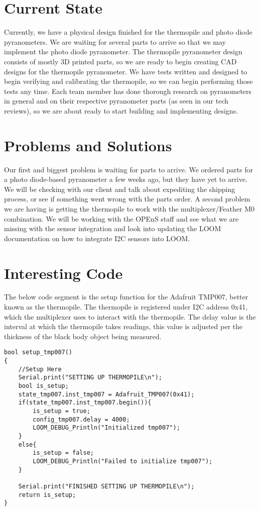 \documentclass[10pt,draftclsnofoot,onecolumn,letterpaper]{article}
\begin{document}
\section{Current State}
Currently, we have a physical design finished for the thermopile and photo diode pyranometers. We are waiting for several parts to arrive so that we may implement the photo diode pyranometer. The thermopile pyranometer design consists of mostly 3D printed parts, so we are ready to begin creating CAD designs for the thermopile pyranometer. We have tests written and designed to begin verifying and calibrating the thermopile, so we can begin performing those tests any time. Each team member has done thorough research on pyranometers in general and on their respective pyranometer parts (as seen in our tech reviews), so we are about ready to start building and implementing designs.
\section{Problems and Solutions}
Our first and biggest problem is waiting for parts to arrive. We ordered parts for a photo diode-based pyranometer a few weeks ago, but they have yet to arrive. We will be checking with our client and talk about expediting the shipping process, or see if something went wrong with the parts order. A second problem we are having is getting the thermopile to work with the multiplexer/Feather M0 combination. We will be working with the OPEnS staff and see what we are missing with the sensor integration and look into updating the LOOM documentation on how to integrate I2C sensors into LOOM.
\section{Interesting Code}
The below code segment is the setup function for the Adafruit TMP007, better known as the thermopile. The thermopile is registered under I2C address 0x41, which the multiplexer uses to interact with the thermopile. The delay value is the interval at which the thermopile takes readings, this value is adjusted per the thickness of the black body object being measured.
\begin{lstlisting}[caption={TMP007 Setup},captionpos=b]
bool setup_tmp007() 
{
    //Setup Here
    Serial.print("SETTING UP THERMOPILE\n");
	bool is_setup;
	state_tmp007.inst_tmp007 = Adafruit_TMP007(0x41);
	if(state_tmp007.inst_tmp007.begin()){
		is_setup = true;
		config_tmp007.delay = 4000;
		LOOM_DEBUG_Println("Initialized tmp007");
	}
	else{
		is_setup = false;
		LOOM_DEBUG_Println("Failed to initialize tmp007");
	}

    Serial.print("FINISHED SETTING UP THERMOPILE\n");
    return is_setup;
}
\end{lstlisting}
\end{document}

